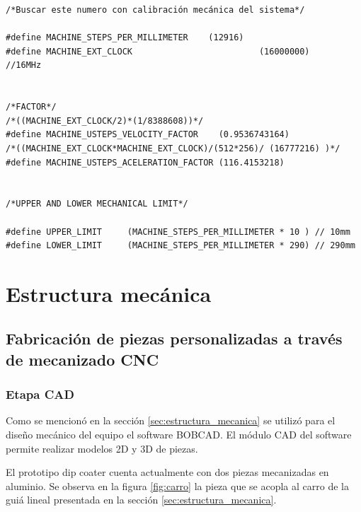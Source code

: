  

\begin{lstlisting}[label=cod:vMachine,caption=Macros de desplazamiento y factores de corrección.]  % Start your code-block
/*Buscar este numero con calibración mecánica del sistema*/

#define MACHINE_STEPS_PER_MILLIMETER	(12916)		
#define MACHINE_EXT_CLOCK						  (16000000)	//16MHz


/*FACTOR*/
/*((MACHINE_EXT_CLOCK/2)*(1/8388608))*/	
#define MACHINE_USTEPS_VELOCITY_FACTOR	  (0.9536743164)
/*((MACHINE_EXT_CLOCK*MACHINE_EXT_CLOCK)/(512*256)/ (16777216) )*/
#define MACHINE_USTEPS_ACELERATION_FACTOR (116.4153218)


/*UPPER AND LOWER MECHANICAL LIMIT*/

#define UPPER_LIMIT 	(MACHINE_STEPS_PER_MILLIMETER * 10 ) // 10mm
#define LOWER_LIMIT		(MACHINE_STEPS_PER_MILLIMETER * 290) // 290mm

\end{lstlisting}







\section{Estructura mecánica}
\subsection{Fabricación de piezas personalizadas a través de mecanizado CNC}

\subsubsection{Etapa CAD}

Como se mencionó en la sección \ref{sec:estructura_mecanica} se utilizó para el diseño mecánico del equipo el software BOBCAD. El módulo CAD del software permite realizar modelos 2D y 3D de piezas.

El prototipo dip coater cuenta actualmente con dos piezas mecanizadas en aluminio. Se observa en la figura \ref{fig:carro} la pieza que se acopla al carro de la guiá lineal presentada en la sección \ref{sec:estructura_mecanica}.

